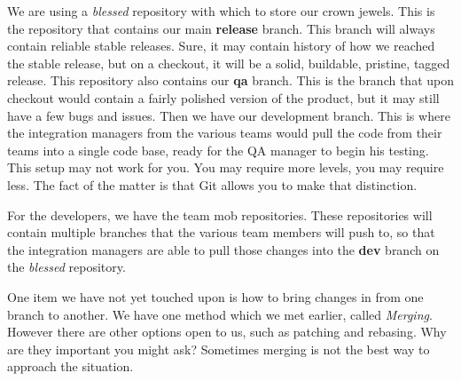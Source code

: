 
We are using a \emph{blessed} repository with which to store our crown jewels.
This is the repository that contains our main \textbf{release} branch.
This branch will always contain reliable stable releases.
Sure, it may contain history of how we reached the stable release, but on a checkout, it will be a solid, buildable, pristine, tagged release.
This repository also contains our \textbf{qa} branch.
This is the branch that upon checkout would contain a fairly polished version of the product, but it may still have a few bugs and issues.
Then we have our development branch.
This is where the integration managers from the various teams would pull the code from their teams into a single code base, ready for the QA manager to begin his testing.
This setup may not work for you.
You may require more levels, you may require less.
The fact of the matter is that Git allows you to make that distinction.

For the developers, we have the team mob repositories.
These repositories will contain multiple branches that the various team members will push to, so that the integration managers are able to pull those changes into the \textbf{dev} branch on the \emph{blessed} repository.

One item we have not yet touched upon is how to bring changes in from one branch to another.
We have one method which we met earlier, called \emph{Merging}.
However there are other options open to us, such as patching and rebasing.
Why are they important you might ask? Sometimes merging is not the best way to approach the situation.

